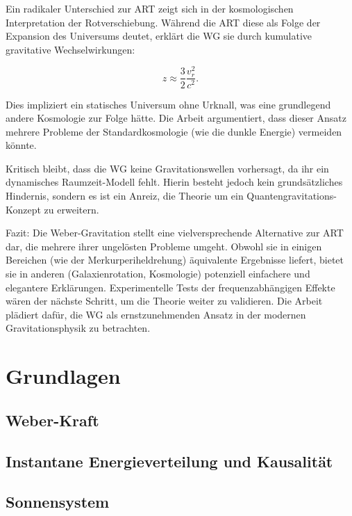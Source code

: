 \documentclass{book}
\numberwithin{equation}{section}
\begin{document}
Ein radikaler Unterschied zur ART zeigt sich in der kosmologischen Interpretation der Rotverschiebung. Während die ART diese als Folge der Expansion des Universums deutet,
erklärt die WG sie durch kumulative gravitative Wechselwirkungen:

\[
z \approx \frac{3}{2} \frac{v_r^2}{c^2}.
\]  

Dies impliziert ein statisches Universum ohne Urknall, was eine grundlegend andere Kosmologie zur Folge hätte. Die Arbeit argumentiert, dass dieser Ansatz mehrere Probleme
der Standardkosmologie (wie die dunkle Energie) vermeiden könnte.  

Kritisch bleibt, dass die WG keine Gravitationswellen vorhersagt, da ihr ein dynamisches Raumzeit-Modell fehlt. Hierin besteht jedoch kein grundsätzliches Hindernis,
sondern es ist ein Anreiz, die Theorie um ein Quantengravitations-Konzept zu erweitern.

Fazit: Die Weber-Gravitation stellt eine vielversprechende Alternative zur ART dar, die mehrere ihrer ungelösten Probleme umgeht. Obwohl sie in einigen Bereichen
(wie der Merkurperiheldrehung) äquivalente Ergebnisse liefert, bietet sie in anderen (Galaxienrotation, Kosmologie) potenziell einfachere und elegantere Erklärungen.
Experimentelle Tests der frequenzabhängigen Effekte wären der nächste Schritt, um die Theorie weiter zu validieren. Die Arbeit plädiert dafür, die WG als
ernstzunehmenden Ansatz in der modernen Gravitationsphysik zu betrachten.

\tableofcontents

\part{Grundlagen}
\chapter{Weber-Kraft}
\label{chapter:weber_kraft}





\chapter{Instantane Energieverteilung und Kausalität}

\chapter{Sonnensystem}
\label{chapter:sonnensystem}



\end{document}
